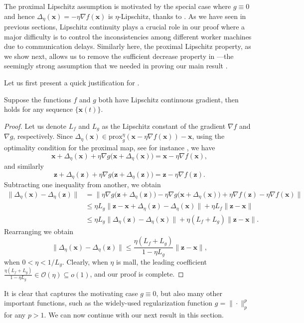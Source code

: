 \documentclass[leqno,onefignum,onetabnum]{siamart0516}
\newcommand{\xb}{\mathbf{x}}
\newcommand{\zb}{\mathbf{z}}
\newcommand{\prox}[2][\eta]{\mathrm{prox}_{#2}^{#1}}
\begin{document}
The proximal Lipschitz assumption is motivated by the special case where $g \equiv 0$ and hence $\Delta_\eta(\xb) = -\eta\nabla f(\xb)$ is $\eta$-Lipschitz, thanks to . As we have seen in previous sections, Lipschitz continuity plays a crucial role in our proof where a major difficulty is to control the inconsistencies among different worker machines due to communication delays. Similarly here, the proximal Lipschitz property, as we show next, allows us to remove the sufficient decrease property in ---the seemingly strong assumption that we needed in proving our main result . 

Let us first present a quick justification for .
\begin{lemma}\label{thm:lcg}
Suppose the functions $f$ and $g$ both have Lipschitz continuous gradient, then  holds for any sequence $\{\xb(t)\}$.
\end{lemma}
\begin{proof}
Let us denote $L_f$ and $L_g$ as the Lipschitz constant of the gradient $\nabla f$ and $\nabla g$, respectively. Since $\Delta_\eta(\xb) \in \prox{g}(\xb - \eta \nabla f(\xb)) - \xb$, using the optimality condition for the proximal map, see for instance \cite[Proposition 7(iii)]{YuZMX15}, we have
$$
\xb + \Delta_\eta(\xb) + \eta \nabla g\big(\xb + \Delta_\eta(\xb)\big) = \xb - \eta \nabla f(\xb),
$$
and similarly
$$
\zb + \Delta_\eta(\zb) + \eta \nabla g\big(\zb + \Delta_\eta(\zb)\big) = \zb - \eta \nabla f(\zb).
$$
Subtracting one inequality from another, we obtain
\begin{align*}
\|\Delta_\eta(\xb) - \Delta_\eta(\zb)\|  &=  \|\eta \nabla g\big(\zb + \Delta_\eta(\zb)\big) - \eta \nabla g\big(\xb + \Delta_\eta(\xb)\big) + \eta \nabla f(\zb) - \eta \nabla f(\xb)\|
\\
&\leq
\eta L_g \| \zb - \xb + \Delta_\eta(\zb) - \Delta_\eta(\xb) \| + \eta L_f \|\zb - \xb\|
\\
&\leq
\eta L_g \| \Delta_\eta(\zb) - \Delta_\eta(\xb) \| + \eta (L_f+L_g) \|\zb - \xb\|.
\end{align*}
Rearranging we obtain
$$
\|\Delta_\eta(\xb) - \Delta_\eta(\zb)\| \leq \frac{\eta(L_f+L_g)}{1-\eta L_g} \|\zb-\xb\|,
$$
when $0 < \eta < 1/L_g$. Clearly, when $\eta$ is mall, the leading coefficient $\tfrac{\eta(L_f+L_g)}{1-\eta L_g} \in \mathcal{O}(\eta) \subseteq o(1)$, and our proof is complete.
\end{proof}
It is clear that  captures the motivating case $g\equiv 0$, but also many other important functions, such as the widely-used regularization function $g = \|\cdot\|_p^p$ for any $p > 1$.
We can now continue with our next result in this section. 
\end{document}

